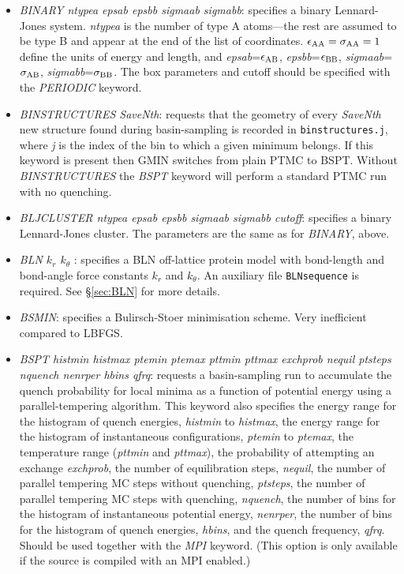 \documentclass[12pt,a4paper,dvips]{article}
\begin{document}
\begin{itemize}
\item {\it BINARY ntypea epsab epsbb sigmaab sigmabb\/}: specifies a binary Lennard-Jones
system. {\it ntypea\/} is the number of type
A atoms---the rest are assumed to be type B and appear at the end of the list
of coordinates. $\epsilon_{\rm AA}=\sigma_{\rm AA}=1$ define the units of energy and length,
and {\it epsab\/}=$\epsilon_{\rm AB}$, {\it epsbb\/}=$\epsilon_{\rm BB}$,
{\it sigmaab\/}=$\sigma_{\rm AB}$, {\it sigmabb\/}=$\sigma_{\rm BB}$.
The box parameters and cutoff should be specified with the {\it PERIODIC\/} keyword.

\item {\it BINSTRUCTURES SaveNth}: requests that the geometry of every {\it SaveNth} 
new structure found during basin-sampling is
recorded in {\tt binstructures.j}, where {\it j} is the index of the bin
to which a given minimum belongs. If this keyword is
present then GMIN switches from plain PTMC to BSPT.  
Without {\it BINSTRUCTURES} the {\it BSPT} keyword will perform a
standard PTMC run with no quenching. 

\item {\it BLJCLUSTER ntypea epsab epsbb sigmaab sigmabb cutoff\/}: specifies a binary Lennard-Jones
cluster. The parameters are the same as for {\it BINARY\/}, above.

\item {\it BLN $k_r$ $k_\theta$ \/}: specifies a BLN off-lattice protein model with
bond-length and bond-angle force constants $k_r$ and $k_\theta$.
An auxiliary file {\tt BLNsequence} is required.
See \S \ref{sec:BLN} for more details.

\item {\it BSMIN\/}: specifies a Bulirsch-Stoer minimisation scheme. 
Very inefficient compared to LBFGS.

\item {\it BSPT histmin histmax ptemin ptemax pttmin pttmax exchprob nequil ptsteps nquench nenrper hbins qfrq\/}: 
requests a basin-sampling run to accumulate the quench probability for local minima 
as a function of potential energy using 
a parallel-tempering algorithm. 
This keyword also specifies the energy range for the histogram of quench energies,
{\it histmin\/} to {\it histmax\/},
the energy range for the histogram of instantaneous configurations, {\it ptemin} to {\it ptemax}, 
the temperature range ({\it pttmin} and {\it pttmax}), 
the probability of attempting an exchange {\it exchprob}, the 
number of equilibration steps, {\it nequil},
the number of parallel tempering MC steps without quenching,  {\it ptsteps},
the number of parallel tempering MC steps with quenching,  {\it nquench},
the number of bins for the histogram of instantaneous potential energy, {\it nenrper},
the number of bins for the histogram of quench energies, {\it hbins},  
and the quench frequency, {\it qfrq}.  
Should be used together with the {\it MPI\/} keyword. %
(This option is only available if the source is compiled with an MPI enabled.)  


\end{itemize}
\end{document}
